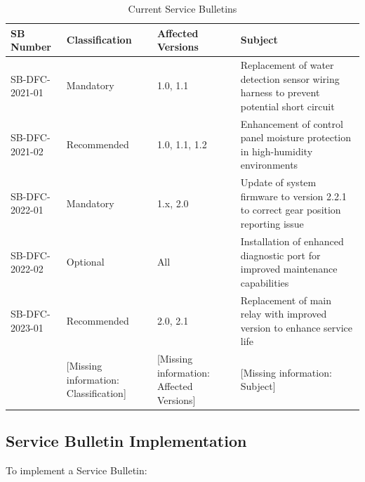 \documentclass[12pt,a4paper,twoside,openright]{book}
\newcommand{\tabletextfont}{\normalfont\rmfamily}
\newcommand{\tableheadfont}{\normalfont\bfseries}
\begin{document}
\begin{table}[h]
\centering
\setlength{\tabcolsep}{5pt} %
\begin{tabular}{|p{}|p{}|p{}|p{}|}
\hline
\tableheadfont\textbf{SB Number} & \tableheadfont\textbf{Classification} & \tableheadfont\textbf{Affected Versions} & \tableheadfont\textbf{Subject} \\
\hline
\tabletextfont SB-DFC-2021-01 & Mandatory & 1.0, 1.1 & Replacement of water detection sensor wiring harness to prevent potential short circuit \\
\hline
\tabletextfont SB-DFC-2021-02 & Recommended & 1.0, 1.1, 1.2 & Enhancement of control panel moisture protection in high-humidity environments \\
\hline
\tabletextfont SB-DFC-2022-01 & Mandatory & 1.x, 2.0 & Update of system firmware to version 2.2.1 to correct gear position reporting issue \\
\hline
\tabletextfont SB-DFC-2022-02 & Optional & All & Installation of enhanced diagnostic port for improved maintenance capabilities \\
\hline
\tabletextfont SB-DFC-2023-01 & Recommended & 2.0, 2.1 & Replacement of main relay with improved version to enhance service life \\
\hline
\tabletextfont {\color{missingred}[Missing information: Additional Service Bulletins]} & {\color{missingred}[Missing information: Classification]} & {\color{missingred}[Missing information: Affected Versions]} & {\color{missingred}[Missing information: Subject]} \\
\hline
\end{tabular}
\caption{Current Service Bulletins}
\end{table}

\subsection{Service Bulletin Implementation}

To implement a Service Bulletin:
\end{document}

